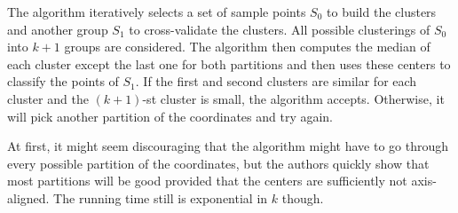 \documentclass[11pt,letter]{article}
\begin{document}
The algorithm iteratively selects a set of sample points $S_0$ to build the clusters and another group $S_1$ to cross-validate the clusters. All possible clusterings of $S_0$ into $k+1$ groups are considered. The algorithm then computes the median of each cluster except the last one for both partitions and then uses these centers to classify the points of $S_1$. If the first and second clusters are similar for each cluster and the $(k+1)$-st cluster is small, the algorithm accepts. Otherwise, it will pick another partition of the coordinates and try again.  

At first, it might seem discouraging that the algorithm might have to go through every possible partition of the coordinates, but the authors quickly show that most partitions will be good provided that the centers are sufficiently not axis-aligned. The running time still is exponential in $k$ though.





 
 
\end{document}
